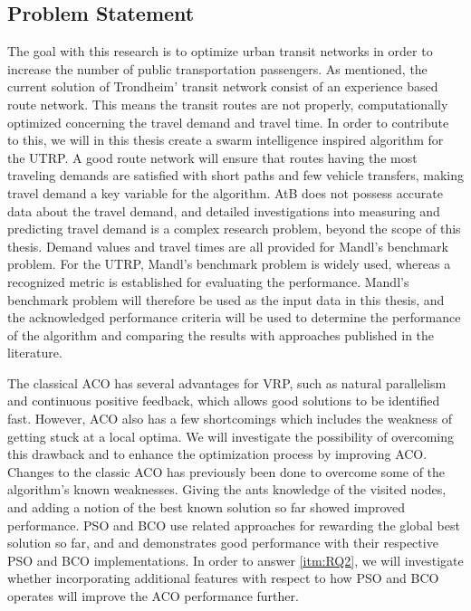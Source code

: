 
\subsection{Problem Statement}
\label{subsec:problemStatement}

The goal with this research is to optimize urban transit networks in order to increase the number of public transportation passengers. As mentioned, the current solution of Trondheim' transit network consist of an experience based route network. This means the transit routes are not properly, computationally optimized concerning the travel demand and travel time. In order to contribute to this, we will in this thesis create a swarm intelligence inspired algorithm for the UTRP. A good route network will ensure that routes having the most traveling demands are satisfied with short paths and few vehicle transfers, making travel demand a key variable for the algorithm. AtB\citep{website:atb} does not possess accurate data about the travel demand, and detailed investigations into measuring and predicting travel demand is a complex research problem, beyond the scope of this thesis. Demand values and travel times are all provided for Mandl's benchmark problem\citep{mandl79}. For the UTRP, Mandl's benchmark problem is widely used, whereas a recognized metric is established for evaluating the performance. Mandl's benchmark problem will therefore be used as the input data in this thesis, and the acknowledged performance criteria will be used to determine the performance of the algorithm and comparing the results with approaches published in the literature\citep{nikolic14,kechagiopoulos14,mandl79,kidwai98, fan10, chakroborty02, zhang10, chew12}.

The classical ACO has several advantages for VRP, such as natural parallelism and continuous positive feedback, which allows good solutions to be identified fast. However, ACO also has a few shortcomings which includes the weakness of getting stuck at a local optima. We will investigate the possibility of overcoming this drawback and to enhance the optimization process by improving ACO. Changes to the classic ACO has previously been done to overcome some of the algorithm's known weaknesses. Giving the ants knowledge of the visited nodes\citep{sedighpour14,salehinejad10,poorzahedy11}, and adding a notion of the best known solution so far\citep{tripathi09,sedighpour14} showed improved performance. PSO and BCO use related approaches for rewarding the global best solution so far, and \citet{kechagiopoulos14} and \citet{nikolic14} demonstrates good performance with their respective PSO and BCO implementations. In order to answer \vref{itm:RQ2}, we will investigate whether incorporating additional features with respect to how PSO and BCO operates will improve the ACO performance further.

